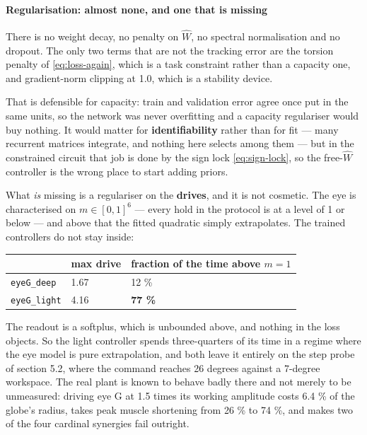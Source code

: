 \documentclass[10pt]{article}
\begin{document}
\paragraph{Regularisation: almost none, and one that is missing}

There is no weight decay, no penalty on $\hat W$, no spectral normalisation and no dropout.
The only two terms that are not the tracking error are the torsion penalty of
\eqref{eq:loss-again}, which is a task constraint rather than a capacity one, and
gradient-norm clipping at 1.0, which is a stability device.

That is defensible for capacity: train and validation error agree once put in the same
units, so the network was never overfitting and a capacity regulariser would buy nothing. It
would matter for \textbf{identifiability} rather than for fit --- many recurrent matrices
integrate, and nothing here selects among them --- but in the constrained circuit that job
is done by the sign lock \eqref{eq:sign-lock}, so the free-$\hat W$ controller is the wrong
place to start adding priors.

What \emph{is} missing is a regulariser on the \textbf{drives}, and it is not cosmetic. The
eye is characterised on $m\in[0,1]^{6}$ --- every hold in the protocol is at a level of 1 or
below --- and above that the fitted quadratic simply extrapolates. The trained controllers
do not stay inside:

\begin{center}\small
\begin{tabular}{lll}\toprule
 & max drive & fraction of the time above $m=1$ \\\midrule
\texttt{eyeG\_deep} & 1.67 & 12 \% \\
\texttt{eyeG\_light} & 4.16 & \textbf{77 \%} \\
\bottomrule\end{tabular}\end{center}

The readout is a softplus, which is unbounded above, and nothing in the loss objects. So the
light controller spends three-quarters of its time in a regime where the eye model is pure
extrapolation, and both leave it entirely on the step probe of section 5.2, where the
command reaches 26 degrees against a 7-degree workspace. The real plant is known to behave
badly there and not merely to be unmeasured: driving eye G at 1.5 times its working
amplitude costs 6.4 \% of the globe's radius, takes peak muscle shortening from 26 \% to 74
\%, and makes two of the four cardinal synergies fail outright.
\end{document}
